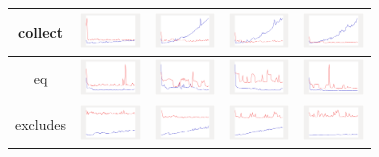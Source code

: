 \begin{longtable}{ c|c c c c}
collect
&
\includegraphics[width=1.6cm]{../graphs/sequence/small/Collect} 
&
\includegraphics[width=1.6cm]{../graphs/set/small/Collect}
&
\includegraphics[width=1.6cm]{../graphs/bag/small/Collect}
&
\includegraphics[width=1.6cm]{../graphs/orderedset/small/Collect}
\\\hline

eq
&
\includegraphics[width=1.6cm]{../graphs/sequence/small/EQ}
&
\includegraphics[width=1.6cm]{../graphs/set/small/EQ}
&
\includegraphics[width=1.6cm]{../graphs/bag/small/EQ}
&
\includegraphics[width=1.6cm]{../graphs/orderedset/small/EQ}
\\\hline

excludes
&
\includegraphics[width=1.6cm]{../graphs/sequence/small/Excludes}
&
\includegraphics[width=1.6cm]{../graphs/set/small/Excludes}
&
\includegraphics[width=1.6cm]{../graphs/bag/small/Excludes}
&
\includegraphics[width=1.6cm]{../graphs/orderedset/small/Excludes}
\\\hline


\end{longtable}
